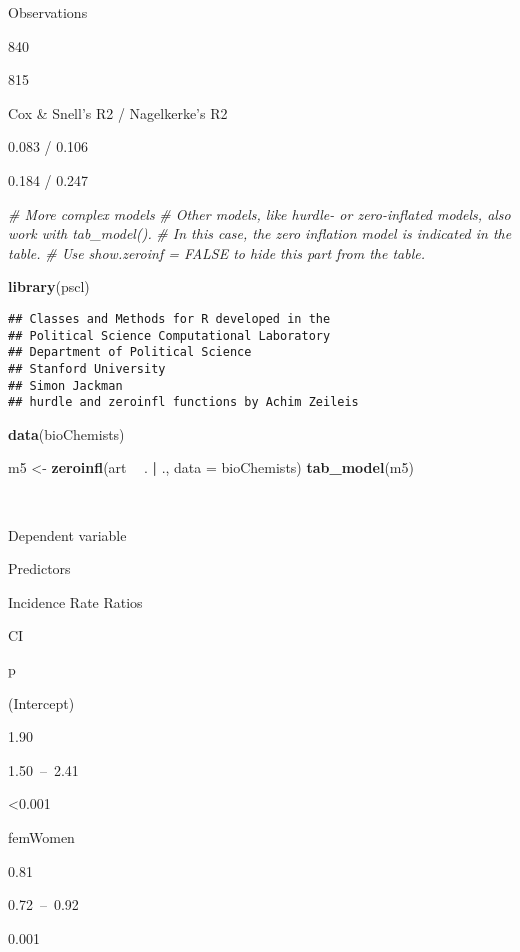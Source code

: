 \documentclass[]{article}
\newenvironment{Shaded}{\begin{snugshade}}{\end{snugshade}}
\newcommand{\KeywordTok}[1]{\textcolor[rgb]{0.13,0.29,0.53}{\textbf{#1}}}
\newcommand{\DataTypeTok}[1]{\textcolor[rgb]{0.13,0.29,0.53}{#1}}
\newcommand{\StringTok}[1]{\textcolor[rgb]{0.31,0.60,0.02}{#1}}
\newcommand{\CommentTok}[1]{\textcolor[rgb]{0.56,0.35,0.01}{\textit{#1}}}
\newcommand{\OperatorTok}[1]{\textcolor[rgb]{0.81,0.36,0.00}{\textbf{#1}}}
\newcommand{\NormalTok}[1]{#1}
\begin{document}
Observations

840

815

Cox \& Snell's R2 / Nagelkerke's R2

0.083 / 0.106

0.184 / 0.247

\begin{Shaded}
\begin{Highlighting}[]
\CommentTok{# More complex models}
\CommentTok{# Other models, like hurdle- or zero-inflated models, also work with tab_model().}
\CommentTok{# In this case, the zero inflation model is indicated in the table.}
\CommentTok{# Use show.zeroinf = FALSE to hide this part from the table.}

\KeywordTok{library}\NormalTok{(pscl)}
\end{Highlighting}
\end{Shaded}

\begin{verbatim}
## Classes and Methods for R developed in the
## Political Science Computational Laboratory
## Department of Political Science
## Stanford University
## Simon Jackman
## hurdle and zeroinfl functions by Achim Zeileis
\end{verbatim}

\begin{Shaded}
\begin{Highlighting}[]
\KeywordTok{data}\NormalTok{(bioChemists)}

\NormalTok{m5 <-}\StringTok{ }\KeywordTok{zeroinfl}\NormalTok{(art }\OperatorTok{~}\StringTok{ }\NormalTok{. }\OperatorTok{|}\StringTok{ }\NormalTok{., }\DataTypeTok{data =}\NormalTok{ bioChemists)}
\KeywordTok{tab_model}\NormalTok{(m5)}
\end{Highlighting}
\end{Shaded}

~

Dependent variable

Predictors

Incidence Rate Ratios

CI

p

(Intercept)

1.90

1.50~--~2.41

\textless{}0.001

femWomen

0.81

0.72~--~0.92

0.001
\end{document}
